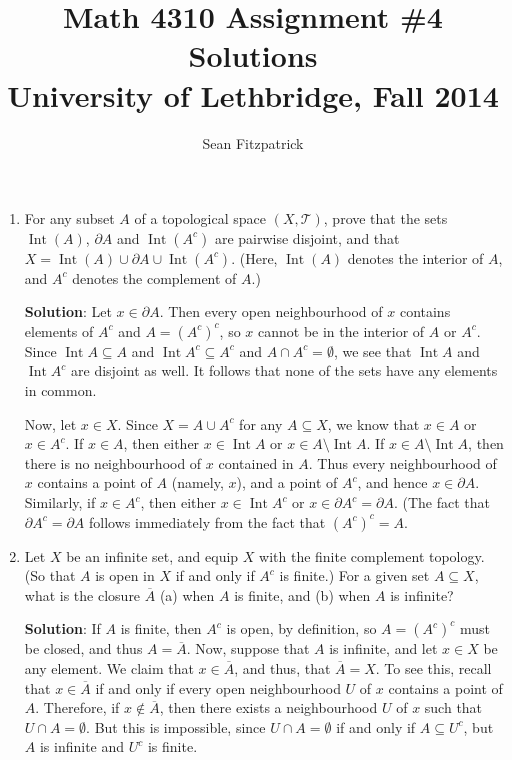 \documentclass[letterpaper,12pt]{article}
\title{Math 4310 Assignment \#4 Solutions\\University of Lethbridge, Fall 2014}
\author{Sean Fitzpatrick}
\newcommand{\T}{\mathcal{T}}
\DeclareMathOperator{\Int}{Int}
\begin{document}
 \maketitle

\begin{enumerate}
\item For any subset $A$ of a topological space $(X,\T)$, prove that the sets $\Int(A)$, $\partial A$ and $\Int(A^c)$ are pairwise disjoint, and that $X = \Int(A)\cup \partial A\cup \Int(A^c)$. (Here, $\Int(A)$ denotes the interior of $A$, and $A^c$ denotes the complement of $A$.)

\bigskip

{\bf Solution}: Let $x\in \partial A$. Then every open neighbourhood of $x$ contains elements of $A^c$ and $A = (A^c)^c$, so $x$ cannot be in the interior of $A$ or $A^c$. Since $\Int A\subseteq A$ and $\Int A^c\subseteq A^c$ and $A\cap A^c=\emptyset$, we see that $\Int A$ and $\Int A^c$ are disjoint as well. It follows that none of the sets have any elements in common.

Now, let $x\in X$. Since $X=A\cup A^c$ for any $A\subseteq X$, we know that $x\in A$ or $x\in A^c$. If $x\in A$, then either $x\in \Int A$ or $x\in A\setminus \Int A$. If $x\in A\setminus \Int A$, then there is no neighbourhood of $x$ contained in $A$. Thus every neighbourhood of $x$ contains a point of $A$ (namely, $x$), and a point of $A^c$, and hence $x\in\partial A$.
Similarly, if $x\in A^c$, then either $x\in \Int A^c$ or $x\in\partial A^c = \partial A$. (The fact that $\partial A^c = \partial A$ follows immediately from the fact that $(A^c)^c = A$.

\item Let $X$ be an infinite set, and equip $X$ with the finite complement topology. (So that $A$ is open in $X$ if and only if $A^c$ is finite.) For a given set $A\subseteq X$, what is the closure $\overline{A}$ (a) when $A$ is finite, and (b) when $A$ is infinite?

\bigskip

{\bf Solution}: If $A$ is finite, then $A^c$ is open, by definition, so $A=(A^c)^c$ must be closed, and thus $A=\overline{A}$. Now, suppose that $A$ is infinite, and let $x\in X$ be any element. We claim that $x\in\overline{A}$, and thus, that $\overline{A}=X$. To see this, recall that $x\in\overline{A}$ if and only if every open neighbourhood $U$ of $x$ contains a point of $A$. Therefore, if $x\notin\overline{A}$, then there exists a neighbourhood $U$ of $x$ such that $U\cap A=\emptyset$. But this is impossible, since $U\cap A=\emptyset$ if and only if $A\subseteq U^c$, but $A$ is infinite and $U^c$ is finite.


\end{enumerate}
\end{document}
